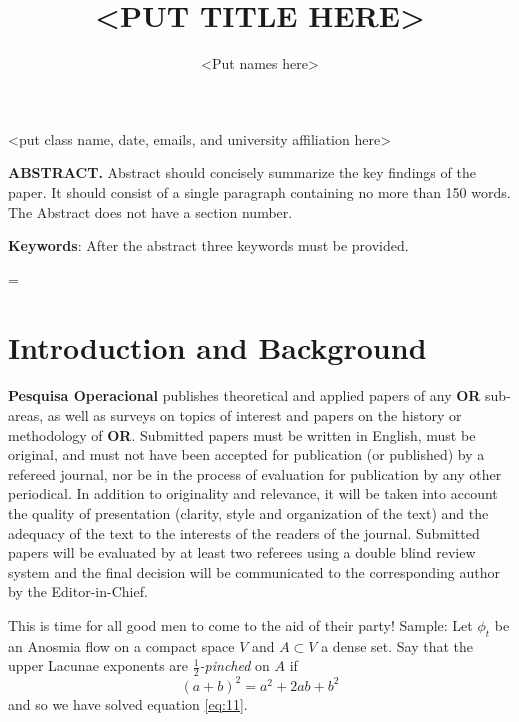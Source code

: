 \documentclass[10pt]{article}
\title{\renewcommand{\baselinestretch}{1.17}\normalsize\bf%
\uppercase{<Put Title Here>}
}
\author{%
<Put names here>
}
\begin{document}
\date{}

\maketitle

\vspace{-0.5cm}

\begin{center}
{\footnotesize 
<put class name, date, emails, and university affiliation here>
}
\end{center}

\bigskip
\noindent
{\small{\bf ABSTRACT.}
Abstract should concisely
summarize the key findings of the paper. It should consist 
of a single paragraph containing no more than 150 words. 
The Abstract does not have a section number.
}

\medskip
\noindent
{\small{\bf Keywords}{:} 
After the abstract three keywords must be provided.
}

\baselineskip=\normalbaselineskip

\section{Introduction and Background}\label{sec:1}

{\bf Pesquisa Operacional} publishes theoretical and applied papers 
of any {\bf OR} sub-areas, as well as surveys on topics of interest 
and papers on the history or methodology of {\bf OR}. Submitted 
papers must be written in English, must be original, and must not 
have been accepted for publication (or published) by a refereed 
journal, nor be in the process of evaluation for publication by 
any other periodical. In addition to originality and relevance, 
it will be taken into account the quality of presentation (clarity, 
style and organization of the text) and the adequacy of the text 
to the interests of the readers of the journal. Submitted papers 
will be evaluated by at least two referees using a double blind 
review system and the final decision will be communicated to the 
corresponding author by the Editor-in-Chief.

This is time for all good men to come to the aid of their party!
Sample: Let $\phi_{t}$ be an Anosmia flow on a compact space $V$ 
and $A \subset V$ a dense set. Say that the upper Lacunae
exponents are \emph{$\frac{1}{2}$-pinched} on $A$ if
\begin{equation}\label{eq:11}
(a+b)^2 = a^2 + 2ab + b^2
\end{equation}
and so we have solved equation \ref{eq:11}.
\end{document}
